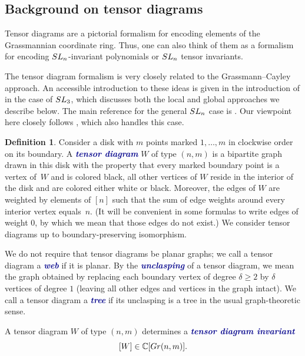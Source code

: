 \documentclass[10pt]{amsart}
\theoremstyle{definition}
\newtheorem{definition}[cdrthm]{Definition}
\theoremstyle{plain}
\theoremstyle{plain}
\theoremstyle{definition}
\theoremstyle{remark}
\theoremstyle{plain}
\theoremstyle{plain}
\theoremstyle{plain}
\numberwithin{equation}{section}
\newcommand{\newword}[1]{\textcolor{darkblue}{\textbf{\emph{#1}}}}
\begin{document}
\subsection{Background on tensor diagrams}\label{sec:TDbackground}
Tensor diagrams are a pictorial formalism for encoding elements of the Grassmannian coordinate ring. Thus, one can also think of them as a formalism for encoding ${\rm SL}_n$-invariant polynomials or ${\rm SL}_n$ tensor invariants.


The tensor diagram formalism is very closely related to the Grassmann--Cayley approach. An accessible introduction to these ideas is given in the introduction of \cite{Fomin.Pylyavskyy} in the case of ${\rm SL}_3$, which discusses both the local and global approaches we describe below. The main reference for the general ${\rm SL}_n$ case is   \cite{Cautis.Kamnitzer.Morrison}. Our viewpoint here closely follows \cite{Fraser.Lam.Le}, which also handles this case.


\begin{definition}\label{defn:tensordiagram}
Consider a disk with $m$ points marked $1,\dots,m$ in clockwise order on its boundary. A \newword{tensor diagram} $W$ of type $(n,m)$ is a bipartite graph drawn in this disk with the property that every marked boundary point is a vertex of~$W$ and is colored black, all other vertices of $W$ reside in the interior of the disk and are colored either white or black. Moreover, the edges of $W$ are weighted by elements of $[n]$ such that the sum of edge weights around every interior vertex equals~$n$. (It will be convenient in some formulas to write edges of weight $0$, by which we mean that those edges do not exist.) We consider tensor diagrams up to boundary-preserving isomorphism.
\end{definition}

We do not require that tensor diagrams be planar graphs; we call a tensor diagram a \newword{web} if it is planar. By the \newword{unclasping} of a tensor diagram, we mean the graph obtained by replacing each boundary vertex of degree $\delta \geq 2$ by $\delta$ vertices of degree $1$ (leaving all other edges and vertices in the graph intact). We call a tensor diagram a \newword{tree} if its unclasping is a tree in the usual graph-theoretic sense.

A tensor diagram $W$ of type $(n,m)$ determines a \newword{tensor diagram invariant} 
\begin{equation}\label{eq:globaldefinition}
[W] \in \mathbb{C}[{\rm Gr}(n,m)].
\end{equation}
\end{document}
